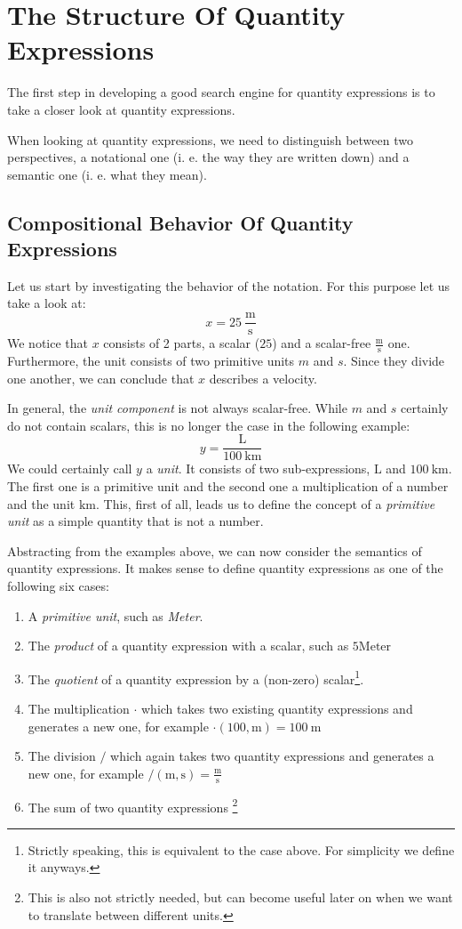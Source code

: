 \section{The Structure Of Quantity Expressions}
\label{sec:strucqe}

The first step in developing a good search engine for quantity expressions is to take a closer look at quantity expressions.

When looking at quantity expressions, we need to distinguish between two perspectives, a notational one (i. e. the way they are written down) and a semantic one (i. e. what they mean).

\subsection{Compositional Behavior Of Quantity Expressions}
Let us start by investigating the behavior of the notation. For this purpose let us take a look at:
\[x = 25\ \frac{\text{m}}{\text{s}}\]
We notice that $x$ consists of 2 parts, a scalar ($25$) and a scalar-free $\frac{\text{m}}{\text{s}}$ one. Furthermore, the unit consists of two primitive units $m$ and $s$. Since they divide one another, we can conclude that $x$ describes a velocity.

In general, the \textit{unit component} is not always scalar-free. While $m$ and $s$ certainly do not contain scalars, this is no longer the case in the following example:
\[y = \frac{\text{L}}{100\ \text{km}}\]
We could certainly call $y$ a \textit{unit}. It consists of two sub-expressions, $\text{L}$ and $100\ \text{km}$. The first one is a primitive unit and the second one a multiplication of a number and the unit $\text{km}$. This, first of all, leads us to define the concept of a \textit{primitive unit} as a simple quantity that is not a number.

Abstracting from the examples above, we can now consider the semantics of quantity expressions. It makes sense to define quantity expressions as one of the following six cases:
\begin{enumerate}
  \item A \textit{primitive unit}, such as \textit{Meter}.
  \item The \textit{product} of a quantity expression with a scalar, such as $5 \text{Meter}$
  \item The \textit{quotient} of a quantity expression by a (non-zero) scalar\footnote{Strictly speaking, this is equivalent to the case above. For simplicity we define it anyways. }.
  \item The multiplication $\cdot{}$ which takes two existing quantity expressions and generates a new one, for example $\cdot \left(100, \text{m} \right) = 100\ \text{m}$
  \item The division $/$ which again takes two quantity expressions and generates a new one, for example $\text{/} (\text{m}, \text{s}) = \frac{\text{m}}{\text{s}}$
  \item The sum of two quantity expressions \footnote{This is also not strictly needed, but can become useful later on when we want to translate between different units. }
\end{enumerate}


